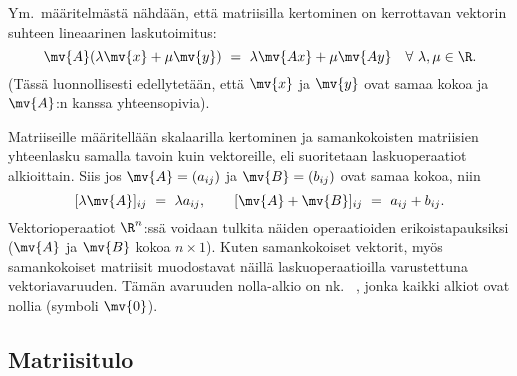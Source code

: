 Ym.\ määritelmästä nähdään, että matriisilla kertominen on kerrottavan vektorin suhteen 
lineaarinen laskutoimitus:
\[ 
\mv{A}(\lambda \mv{x} + \mu \mv{y})\ =\ \lambda \mv{Ax} + \mu \mv{Ay} \quad 
                                               \forall\ \lambda,\mu \in \R.
\]
(Tässä luonnollisesti edellytetään, että $\mv{x}$ ja $\mv{y}$ ovat samaa kokoa ja $\mv{A}$:n 
kanssa yhteensopivia).

Matriiseille määritellään skalaarilla kertominen ja samankokoisten matriisien yhteenlasku 
samalla tavoin kuin vektoreille, eli suoritetaan laskuoperaatiot alkioittain. Siis jos
$\mv{A} = (a_{ij})$ ja $\mv{B} = (b_{ij})$ ovat samaa kokoa, niin
\[ 
[\lambda \mv{A}]_{ij}\ =\ \lambda a_{ij}, \quad\quad [\mv{A}+\mv{B}]_{ij}\ =\ a_{ij} + b_{ij}. 
\]
Vektorioperaatiot $\R^n$:ssä voidaan tulkita näiden operaatioiden erikoistapauksiksi 
($\mv{A}$ ja $\mv{B}$ kokoa $n \times 1$). Kuten samankokoiset vektorit, myös samankokoiset 
matriisit muodostavat näillä laskuoperaatioilla varustettuna vektoriavaruuden. Tämän avaruuden
nolla-alkio on nk.\
%
, jonka kaikki alkiot ovat nollia (symboli $\mv{0}$).

\subsection{Matriisitulo}


